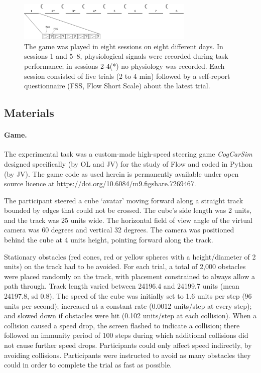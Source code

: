 \documentclass[fleqn,10pt]{wlscirep}
\newcommand{\nicewidth}{0.75\textwidth}
\begin{document}
\begin{figure}[!ht]
\centering
\includegraphics[width=\nicewidth]{design1}
\caption{The game was played in eight sessions on eight different days. In sessions 1 and 5--8, physiological signals were recorded during task performance; in sessions 2-4(*) no physiology was recorded. Each session consisted of five trials (2 to 4 min) followed by a self-report questionnaire (FSS, Flow Short Scale) about the latest trial.}
\label{fig:design}
\end{figure}

\subsection*{Materials}
\paragraph{Game.} The experimental task was a custom-made high-speed steering game {\it CogCarSim} designed specifically (by OL and JV) for the study of Flow and coded in Python (by JV). The game code as used herein is permanently available under open source licence at \url{https://doi.org/10.6084/m9.figshare.7269467}.

The participant steered a cube `avatar' moving forward along a straight track bounded by edges that could not be crossed. The cube's side length was 2 units, and the track was 25 units wide.  The horizontal field of view angle of the virtual camera was 60 degrees and vertical 32 degrees. The camera was positioned behind the cube at 4 units height, pointing forward along the track.

Stationary obstacles (red cones, red or yellow spheres with a height/diameter of 2 units) on the track had to be avoided. For each trial, a total of 2,000 obstacles were placed randomly on the track, with placement constrained to always allow a path through. Track length varied between 24196.4 and 24199.7 units (mean 24197.8, sd 0.8). The speed of the cube was initially set to 1.6 units per step (96 units per second); increased at a constant rate (0.0012 units/step at every step); and slowed down if obstacles were hit (0.102 units/step at each collision). When a collision caused a speed drop, the screen flashed to indicate a collision; there followed an immunity period of 100 steps during which additional collisions did not cause further speed drops. Participants could only affect speed indirectly, by avoiding collisions.  Participants were instructed to avoid as many obstacles they could in order to complete the trial as fast as possible.
\end{document}
